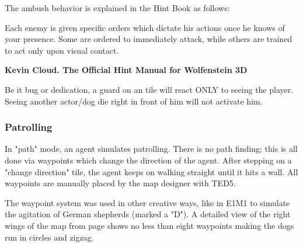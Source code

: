 \par

 The ambush behavior is explained in the Hint Book as follows:\\
\par
\begin{fancyquotes}
Each enemy is given specific orders which dictate his actions once he knows of your presence. Some are ordered to immediately attack, while others are trained to act only upon visual contact.\\
\par
\textbf{Kevin Cloud. The Official Hint Manual for Wolfenstein 3D}
 \end{fancyquotes}
\par
{} Be it bug or dedication, a guard on an  tile will react ONLY to seeing the player. Seeing another actor/dog die right in front of him will not activate him.\\


\subsubsection{Patrolling}
In "path" mode, an agent simulates patrolling. There is no path finding; this is all done via waypoints which change the direction of the agent. After stepping on a "change direction" tile, the agent keeps on walking straight until it hits a wall. All waypoints are manually placed by the map designer with TED5.\\ 
\par
The waypoint system was used in other creative ways, like in E1M1 to simulate the agitation of German shepherds (marked a "D"). A detailed view of the right wings of the map from page \pageref{mape1m1} shows no less than eight waypoints making the dogs run in circles and zigzag.\\
\par
\begin{figure}[H]
 \centering
\end{figure}
\par




